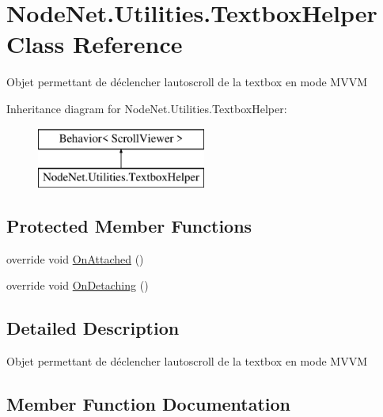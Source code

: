 \hypertarget{class_node_net_1_1_utilities_1_1_textbox_helper}{}\section{Node\+Net.\+Utilities.\+Textbox\+Helper Class Reference}
\label{class_node_net_1_1_utilities_1_1_textbox_helper}


Objet permettant de déclencher l\textquotesingle{}autoscroll de la textbox en mode M\+V\+VM  


Inheritance diagram for Node\+Net.\+Utilities.\+Textbox\+Helper\+:\begin{figure}[H]
\begin{center}
\leavevmode
\includegraphics[height=2.000000cm]{class_node_net_1_1_utilities_1_1_textbox_helper}
\end{center}
\end{figure}
\subsection*{Protected Member Functions}
\begin{DoxyCompactItemize}
\item 
override void \hyperlink{class_node_net_1_1_utilities_1_1_textbox_helper_abc80ac599c0665a15b6788e34302ff30}{On\+Attached} ()
\item 
override void \hyperlink{class_node_net_1_1_utilities_1_1_textbox_helper_ad52f874199c2af86700bb9cdb3f80f76}{On\+Detaching} ()
\end{DoxyCompactItemize}


\subsection{Detailed Description}
Objet permettant de déclencher l\textquotesingle{}autoscroll de la textbox en mode M\+V\+VM 



\subsection{Member Function Documentation}
\mbox{\label{class_node_net_1_1_utilities_1_1_textbox_helper_abc80ac599c0665a15b6788e34302ff30}} 
